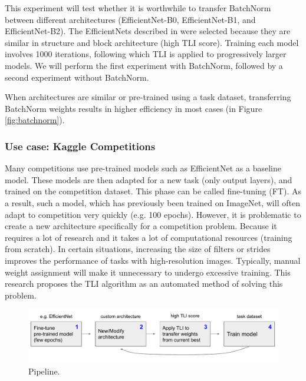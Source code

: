 \documentclass{article} %
\begin{document}
This experiment will test whether it is worthwhile to transfer BatchNorm between different architectures (EfficientNet-B0, EfficientNet-B1, and EfficientNet-B2).
%
The EfficientNets described in \citep{tan2019efficientnet} were selected because they are similar in structure and block architecture (high TLI score).
%
Training each model involves 1000 iterations, following which TLI is applied to progressively larger models.
%
We will perform the first experiment with BatchNorm, followed by a second experiment without BatchNorm.

When architectures are similar or pre-trained using a task dataset, transferring
BatchNorm weights results in higher efficiency in most cases (in Figure
\ref{fig:batchnorm}).

\subsubsection{Use case: Kaggle Competitions} %


Many competitions use pre-trained models such as EfficientNet as a baseline
model. These models are then adapted for a new task (only output layers), and
trained on the competition dataset. This phase can be called fine-tuning (FT).
%
As a result, such a model, which has previously been trained on ImageNet, will
often adapt to competition very quickly (e.g. 100 epochs).
%
However, it is problematic to create a new architecture specifically for a
competition problem.
%
Because it requires a lot of research and it takes a lot of computational resources (training from scratch).
%
In certain situations, increasing the size of filters or strides improves the performance of tasks with high-resolution images.
%
Typically, manual weight assignment will make it unnecessary to undergo excessive training. This research proposes the TLI algorithm as an automated method of solving this problem.

\begin{figure}[h]
	\begin{center}
	\center\includegraphics[width=\linewidth]{figures/v1_kaggle_diagram}
	\end{center}
	\caption{Pipeline.}
	\label{fig:pipeline}
\end{figure}
\end{document}
